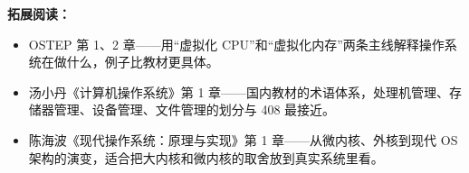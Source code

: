 \medskip
\noindent\textbf{拓展阅读：}
\begin{itemize}
    \item OSTEP 第 1、2 章——用“虚拟化 CPU”和“虚拟化内存”两条主线解释操作系统在做什么，例子比教材更具体。
    \item 汤小丹《计算机操作系统》第 1 章——国内教材的术语体系，处理机管理、存储器管理、设备管理、文件管理的划分与 408 最接近。
    \item 陈海波《现代操作系统：原理与实现》第 1 章——从微内核、外核到现代 OS 架构的演变，适合把大内核和微内核的取舍放到真实系统里看。
\end{itemize}

\newpage

